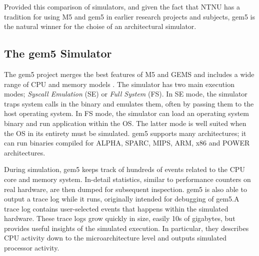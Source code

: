Provided this comparison of simulators, and given the fact that NTNU has a tradition
for using M5 and gem5 in earlier research projects and subjects, gem5 is the natural
winner for the choise of an architectural simulator.


\subsection{The gem5 Simulator}

The gem5 project \cite{gem5} merges the best features of M5 \cite{binkert2006m5}
and GEMS \cite{GEMS} and includes a wide range of CPU and memory models
\cite{gem5hipeac}. The simulator has two main execution modes; \textit{Syscall
Emulation} (SE) or \textit{Full System} (FS). In SE mode, the simulator traps
system calls in the binary and emulates them, often by passing them to the host
operating system. In FS mode, the simulator can load an operating system binary
and run application within the OS. The latter mode is well suited when the OS in
its entirety must be simulated. gem5 supports many architectures; it can run
binaries compiled for ALPHA, SPARC, MIPS, ARM, x86 and POWER architectures.

During simulation, gem5 keeps track of hundreds of events related to the CPU
core and memory system. In-detail statistics, similar to performance counters on
real hardware, are then dumped for subsequent inspection. gem5 is also able to
output a trace log while it runs, originally intended for debugging of gem5.A
trace log contains user-selected events that happens within the simulated
hardware. These trace logs grow quickly in size, easily 10s of gigabytes, but
provides useful insights of the simulated execution. In particular, they describes
CPU activity down to the microarchitecture level and outputs simulated processor
activity.

